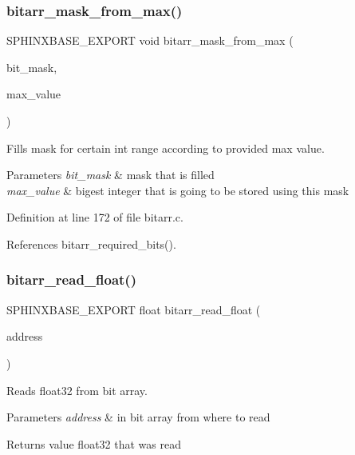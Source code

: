\subsubsection{bitarr\+\_\+mask\+\_\+from\+\_\+max()}
{\footnotesize\ttfamily S\+P\+H\+I\+N\+X\+B\+A\+S\+E\+\_\+\+E\+X\+P\+O\+RT void bitarr\+\_\+mask\+\_\+from\+\_\+max (\begin{DoxyParamCaption}\item[{\textbf{ bitarr\+\_\+mask\+\_\+t} $\ast$}]{bit\+\_\+mask,  }\item[{uint32}]{max\+\_\+value }\end{DoxyParamCaption})}



Fills mask for certain int range according to provided max value. 


\begin{DoxyParams}{Parameters}
{\em bit\+\_\+mask} & mask that is filled \\
\hline
{\em max\+\_\+value} & bigest integer that is going to be stored using this mask \\
\hline
\end{DoxyParams}


Definition at line 172 of file bitarr.\+c.



References bitarr\+\_\+required\+\_\+bits().

\mbox{\label{bitarr_8h_a535b34c0dd2b78578dcba6d9a0a9d94a}} 
\subsubsection{bitarr\+\_\+read\+\_\+float()}
{\footnotesize\ttfamily S\+P\+H\+I\+N\+X\+B\+A\+S\+E\+\_\+\+E\+X\+P\+O\+RT float bitarr\+\_\+read\+\_\+float (\begin{DoxyParamCaption}\item[{\textbf{ bitarr\+\_\+address\+\_\+t}}]{address }\end{DoxyParamCaption})}



Reads float32 from bit array. 


\begin{DoxyParams}{Parameters}
{\em address} & in bit array from where to read \\
\hline
\end{DoxyParams}
\begin{DoxyReturn}{Returns}
value float32 that was read 
\end{DoxyReturn}


